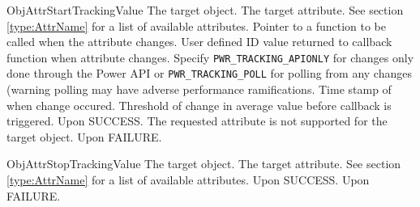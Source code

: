 \begin{prototype}{ObjAttrStartTrackingValue}
		{\pInput}	{The target object.}
		{\pInput}	{The target attribute. See section \ref{type:AttrName} for a list of available attributes.}
		{\pInput}	{Pointer to a function to be called when the attribute changes.}
	              {\pInput}   {User defined ID value returned to callback function when attribute changes.}
		{\pInput}   {Specify \texttt{PWR_TRACKING_APIONLY} for changes
	only done through the Power API or \texttt{PWR_TRACKING_POLL} for polling from any changes (warning polling may have adverse performance ramifications.}
	 {\pinput} {Time stamp of when change occured.}
         {\pinput} {Threshold of change in average value before callback is triggered.}
	 			{Upon SUCCESS.}
	 		{The requested attribute is not supported for the target object.}
	 			{Upon FAILURE.}
\end{prototype}
\begin{prototype}{ObjAttrStopTrackingValue}
		{\pInput}	{The target object.}
		{\pInput}	{The target attribute. See section \ref{type:AttrName} for a list of available attributes.}
	 			{Upon SUCCESS.}
	 			{Upon FAILURE.}
\end{prototype}

